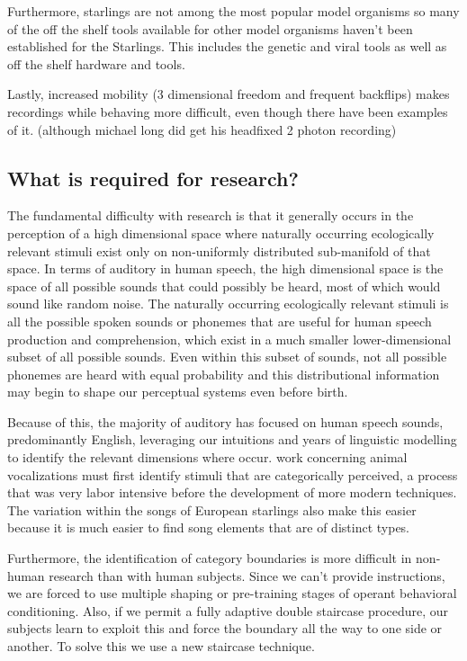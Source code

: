Furthermore, starlings are not among the most popular model organisms so many of the off the shelf tools available for other model organisms haven't been established for the Starlings. This includes the genetic and viral tools as well as off the shelf hardware and tools.

Lastly, increased mobility (3 dimensional freedom and frequent backflips) makes recordings while behaving more difficult, even though there have been examples of it\cite{knudsen2013active,others}. (although michael long did get his headfixed 2 photon recording)

\subsection{What is required for \CP research?}

The fundamental difficulty with \CP research is that it generally occurs in the perception of a high dimensional space where naturally occurring ecologically relevant stimuli exist only on non-uniformly distributed sub-manifold of that space. In terms of auditory \CP in human speech, the high dimensional space is the space of all possible sounds that could possibly be heard, most of which would sound like random noise. The naturally occurring ecologically relevant stimuli is all the possible spoken sounds or phonemes that are useful for human speech production and comprehension, which exist in a much smaller lower-dimensional subset of all possible sounds. Even within this subset of sounds, not all possible phonemes are heard with equal probability and this distributional information may begin to shape our perceptual systems even before birth.

Because of this, the majority of auditory \CP has focused on human speech sounds, predominantly English, leveraging our intuitions and years of linguistic modelling to identify the relevant dimensions where \CP occur. \CP work concerning animal vocalizations must first identify stimuli that are categorically perceived, a process that was very labor intensive\cite{swamp sparrow series of papers} before the development of more modern techniques\cite{Tim's paper on distribution}. The variation within the songs of European starlings also make this easier because it is much easier to find song elements that are of distinct types.

Furthermore, the identification of category boundaries is more difficult in non-human research than with human subjects. Since we can't provide instructions, we are forced to use multiple shaping or pre-training stages of operant behavioral conditioning. Also, if we permit a fully adaptive double staircase procedure, our subjects learn to exploit this and force the boundary all the way to one side or another. To solve this we use a new staircase technique.

